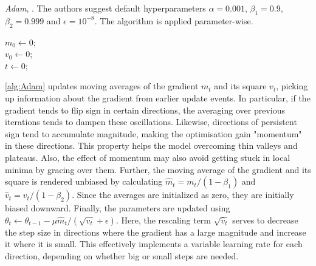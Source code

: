 \begin{algorithm}[H]
\caption{\emph{Adam}, \cite{kingma2017adam}. The authors suggest default hyperparameters $\alpha = 0.001$, $\beta_1 = 0.9$, $\beta_2 = 0.999$ and $\epsilon = 10^{-8}$. The algorithm is applied parameter-wise.}
\label{alg:Adam}
\SetAlgoLined

$m_0 \gets 0$;\\
$v_0 \gets 0$;\\
$t \gets 0$;\\
\end{algorithm}

\cref{alg:Adam} updates moving averages of the gradient $m_t$ and its square $v_t$, picking up information about the gradient from earlier update events. In particular, if the gradient tends to flip sign in certain directions, the averaging over previous iterations tends to dampen these oscillations. Likewise, directions of persistent sign tend to accumulate magnitude, making the optimisation gain "momentum" in these directions. This property helps the model overcoming thin valleys and plateaus. Also, the effect of momentum may also avoid getting stuck in local minima by gracing over them. Further, the moving average of the gradient and its square is rendered unbiased by calculating $\hat{m}_t = m_t/(1-\beta_1)$ and $\hat{v}_t = v_t/(1-\beta_2)$. Since the averages are initialized as zero, they are initially biased downward. Finally, the parameters are updated using $\theta_t \gets \theta_{t-1} - \mu \hat{m}_t/(\sqrt{\hat{v}_t} + \epsilon)$. Here, the rescaling term $\sqrt{\hat{v}_t}$ serves to decrease the step size in directions where the gradient has a large magnitude and increase it where it is small. This effectively implements a variable learning rate for each direction, depending on whether big or small steps are needed. 

